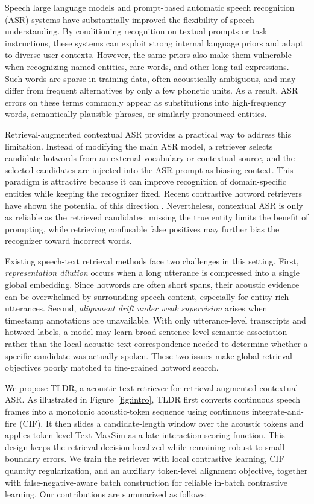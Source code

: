 \documentclass[letterpaper]{article} %
\begin{document}
Speech large language models and prompt-based automatic speech recognition (ASR) systems have substantially improved the flexibility of speech understanding. By conditioning recognition on textual prompts or task instructions, these systems can exploit strong internal language priors and adapt to diverse user contexts. However, the same priors also make them vulnerable when recognizing named entities, rare words, and other long-tail expressions. Such words are sparse in training data, often acoustically ambiguous, and may differ from frequent alternatives by only a few phonetic units. As a result, ASR errors on these terms commonly appear as substitutions into high-frequency words, semantically plausible phrases, or similarly pronounced entities.

Retrieval-augmented contextual ASR provides a practical way to address this limitation. Instead of modifying the main ASR model, a retriever selects candidate hotwords from an external vocabulary or contextual source, and the selected candidates are injected into the ASR prompt as biasing context. This paradigm is attractive because it can improve recognition of domain-specific entities while keeping the recognizer fixed. Recent contrastive hotword retrievers have shown the potential of this direction \cite{kong25_interspeech}. Nevertheless, contextual ASR is only as reliable as the retrieved candidates: missing the true entity limits the benefit of prompting, while retrieving confusable false positives may further bias the recognizer toward incorrect words.

Existing speech-text retrieval methods face two challenges in this setting. First, \emph{representation dilution} occurs when a long utterance is compressed into a single global embedding. Since hotwords are often short spans, their acoustic evidence can be overwhelmed by surrounding speech content, especially for entity-rich utterances. Second, \emph{alignment drift under weak supervision} arises when timestamp annotations are unavailable. With only utterance-level transcripts and hotword labels, a model may learn broad sentence-level semantic association rather than the local acoustic-text correspondence needed to determine whether a specific candidate was actually spoken. These two issues make global retrieval objectives poorly matched to fine-grained hotword search.

We propose TLDR, a acoustic-text retriever for retrieval-augmented contextual ASR. As illustrated in Figure~\ref{fig:intro}, TLDR first converts continuous speech frames into a monotonic acoustic-token sequence using continuous integrate-and-fire (CIF). It then slides a candidate-length window over the acoustic tokens and applies token-level Text MaxSim as a late-interaction scoring function. This design keeps the retrieval decision localized while remaining robust to small boundary errors. We train the retriever with local contrastive learning, CIF quantity regularization, and an auxiliary token-level alignment objective, together with false-negative-aware batch construction for reliable in-batch contrastive learning.
Our contributions are summarized as follows:
\end{document}
